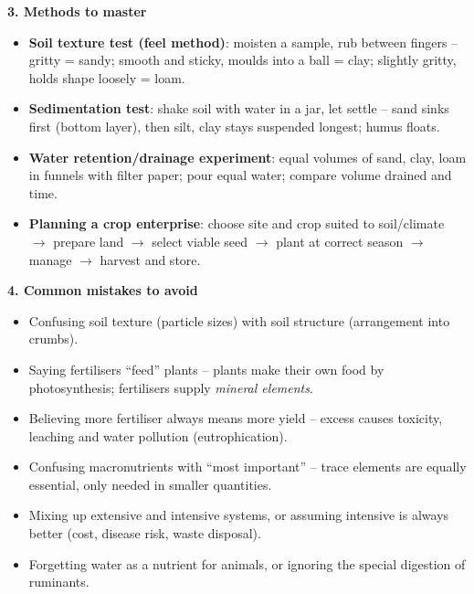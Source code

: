 \documentclass[11pt]{article}
\newcommand{\cle}[1]{{\popxbold\color{popdark}#1}}
\begin{document}
\begin{bilan}
\textbf{3. Methods to master}
\begin{itemize}
\item \textbf{Soil texture test (feel method)}: moisten a sample, rub between fingers -- gritty = sandy; smooth and sticky, moulds into a ball = clay; slightly gritty, holds shape loosely = loam.
\item \textbf{Sedimentation test}: shake soil with water in a jar, let settle -- sand sinks first (bottom layer), then silt, clay stays suspended longest; humus floats.
\item \textbf{Water retention/drainage experiment}: equal volumes of sand, clay, loam in funnels with filter paper; pour equal water; compare volume drained and time.
\item \textbf{Planning a crop enterprise}: choose site and crop suited to soil/climate $\rightarrow$ prepare land $\rightarrow$ select viable seed $\rightarrow$ plant at correct season $\rightarrow$ manage $\rightarrow$ harvest and store.
\end{itemize}

\textbf{4. Common mistakes to avoid}
\begin{itemize}
\item Confusing \cle{soil texture} (particle sizes) with \cle{soil structure} (arrangement into crumbs).
\item Saying fertilisers ``feed'' plants -- plants make their own food by photosynthesis; fertilisers supply \emph{mineral elements}.
\item Believing more fertiliser always means more yield -- excess causes toxicity, leaching and water pollution (eutrophication).
\item Confusing macronutrients with ``most important'' -- trace elements are equally essential, only needed in smaller quantities.
\item Mixing up extensive and intensive systems, or assuming intensive is always better (cost, disease risk, waste disposal).
\item Forgetting water as a nutrient for animals, or ignoring the special digestion of ruminants.
\end{itemize}


\end{bilan}
\end{document}

